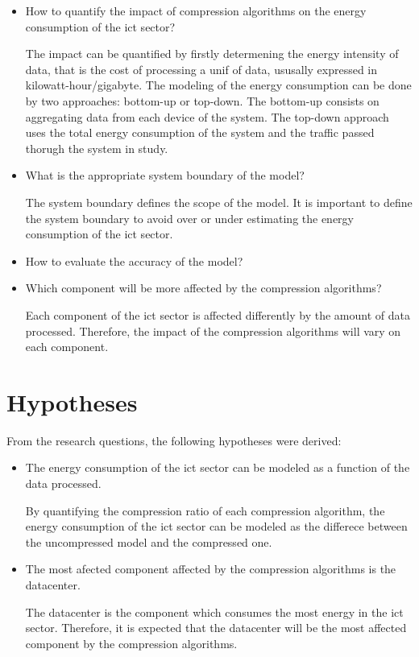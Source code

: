 \begin{itemize}
    \item How to quantify the impact of compression algorithms on the energy consumption of the \ac{ict} sector?

    The impact can be quantified by firstly determening the energy intensity of data, that is the cost of processing a unif of data, ususally expressed in \ac{kilowatt-hour}/\ac{gigabyte}.
    The modeling of the energy consumption can be done by two approaches: bottom-up or top-down. 
    The bottom-up consists on aggregating data from each device of the system.
    The top-down approach uses the total energy consumption of the system and the traffic passed thorugh the system in study.
    
    \item What is the appropriate system boundary of the model?
    
    The system boundary defines the scope of the model. It is important to define the system boundary to avoid over or under estimating the energy consumption of the \ac{ict} sector.

    \item How to evaluate the accuracy of the model?

    
    \item Which component will be more affected by the compression algorithms?

    Each component of the \ac{ict} sector is affected differently by the amount of data processed. Therefore, the impact of the compression algorithms will vary on each component.
\end{itemize}

\section{Hypotheses}
\label{section:hypotheses}

From the research questions, the following hypotheses were derived:

\begin{itemize}
    \item The energy consumption of the \ac{ict} sector can be modeled as a function of the data processed.

    By quantifying the compression ratio of each compression algorithm, the energy consumption of the \ac{ict} sector can be modeled as the differece between the uncompressed model and the compressed one.

    \item The most afected component affected by the compression algorithms is the datacenter.

    The datacenter is the component which consumes the most energy in the \ac{ict} sector. Therefore, it is expected that the datacenter will be the most affected component by the compression algorithms.

\end{itemize}


